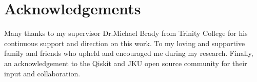\documentclass[a4paper,oneside,12pt]{book}
\begin{document}
\newpage
\onehalfspacing\raggedright %

\section*{\Huge{Acknowledgements}}
Many thanks to my supervisor Dr.Michael Brady from Trinity College for his continuous support and direction on this work. To my loving and supportive family and friends who upheld and encouraged me during my research. Finally, an acknowledgement to the Qiskit and JKU open source community for their input and collaboration.


\tableofcontents
\listoffigures
\newpage

\mainmatter

%








\renewcommand{\thechapter}{A\arabic{chapter}}
%
\end{document}
